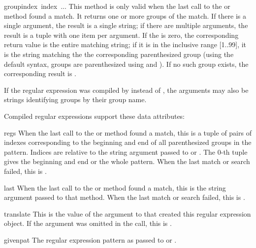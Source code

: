 \begin{funcdesc}{group}{index\, index\, ...}
This method is only valid when the last call to the 
or  method found a match.  It returns one or more
groups of the match.  If there is a single  argument,
the result is a single string; if there are multiple arguments, the
result is a tuple with one item per argument.  If the  is
zero, the corresponding return value is the entire matching string; if
it is in the inclusive range [1..99], it is the string matching the
the corresponding parenthesized group (using the default syntax,
groups are parenthesized using \code{{\e}(} and \code{{\e})}).  If no
such group exists, the corresponding result is .

If the regular expression was compiled by  instead of
, the  arguments may also be strings
identifying groups by their group name.
\end{funcdesc}

\noindent
Compiled regular expressions support these data attributes:


\begin{datadesc}{regs}
When the last call to the  or  method found a
match, this is a tuple of pairs of indexes corresponding to the
beginning and end of all parenthesized groups in the pattern.  Indices
are relative to the string argument passed to  or
.  The 0-th tuple gives the beginning and end or the
whole pattern.  When the last match or search failed, this is
.
\end{datadesc}

\begin{datadesc}{last}
When the last call to the  or  method found a
match, this is the string argument passed to that method.  When the
last match or search failed, this is .
\end{datadesc}

\begin{datadesc}{translate}
This is the value of the  argument to
 that created this regular expression object.  If
the  argument was omitted in the 
call, this is .
\end{datadesc}

\begin{datadesc}{givenpat}
The regular expression pattern as passed to  or
.
\end{datadesc}


